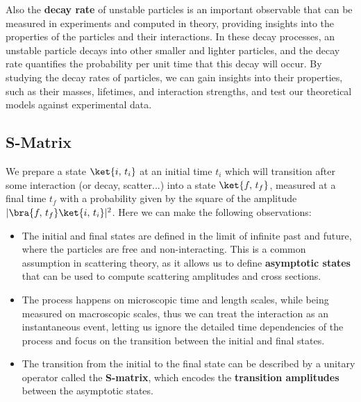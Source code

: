 Also the \textbf{decay rate} of unstable particles is an important observable that can be measured in experiments and computed in theory, providing insights into the properties of the particles and their interactions. In these decay processes, an unstable particle decays into other smaller and lighter particles, and the decay rate quantifies the probability per unit time that this decay will occur. By studying the decay rates of particles, we can gain insights into their properties, such as their masses, lifetimes, and interaction strengths, and test our theoretical models against experimental data.

\subsection{S-Matrix}

We prepare a state \(\ket{i,\,t_i}\) at an initial time \(t_i\) which will transition after some interaction (or decay, scatter...) into a state \(\ket{f,\,t_f}\), measured at a final time \(t_f\) with a probability given by the square of the amplitude \(|\bra{f,\,t_f} \ket{i,\,t_i}|^2\). Here we can make the following observations:
\begin{itemize}
    \item The initial and final states are defined in the limit of infinite past and future, where the particles are free and non-interacting. This is a common assumption in scattering theory, as it allows us to define \textbf{asymptotic states} that can be used to compute scattering amplitudes and cross sections.
    \item The process happens on microscopic time and length scales, while being measured on macroscopic scales, thus we can treat the interaction as an instantaneous event, letting us ignore the detailed time dependencies of the process and focus on the transition between the initial and final states.
    \item The transition from the initial to the final state can be described by a unitary operator called the \textbf{S-matrix}, which encodes the \textbf{transition amplitudes} between the asymptotic states.
\end{itemize}

